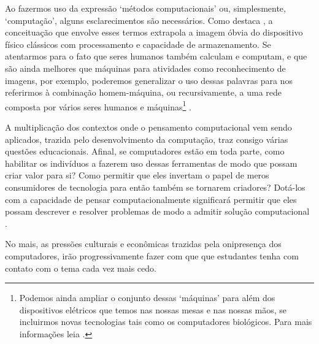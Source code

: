 Ao fazermos uso da expressão `métodos computacionais' ou, simplesmente, `computação', alguns esclarecimentos são necessários. Como destaca , a conceituação que envolve esses termos extrapola a imagem óbvia do dispositivo físico clássicos com processamento e capacidade de armazenamento. Se atentarmos para o fato que seres humanos também calculam e computam, e que são ainda melhores que máquinas para atividades como reconhecimento de imagens, por exemplo, poderemos generalizar o uso dessas palavras para nos referirmos à combinação homem-máquina, ou recursivamente, a uma rede composta por vários seres humanos e máquinas\footnote{Podemos ainda ampliar o conjunto dessas `máquinas' para além dos dispositivos elétricos que temos nas nossas mesas e nas nossas mãos, se incluirmos novas tecnologias tais como os computadores biológicos. Para mais informações leia .} \cite{wing2008,Wing2010}.

A multiplicação dos contextos onde o pensamento computacional vem sendo aplicados, trazida pelo desenvolvimento da computação, traz consigo várias questões educacionais. Afinal, se computadores estão em toda parte, como habilitar os indivíduos a fazerem uso dessas ferramentas de modo que possam criar valor para si? Como permitir que eles invertam o papel de meros consumidores de tecnologia para então também se tornarem criadores? Dotá-los com a capacidade de pensar computacionalmente significará permitir que eles possam descrever e resolver problemas de modo a admitir solução computacional \cite{Wing2010}. 


No mais, as pressões culturais e econômicas trazidas pela onipresença dos computadores, irão progressivamente fazer com que que estudantes tenha com contato com o tema cada vez mais cedo. 




